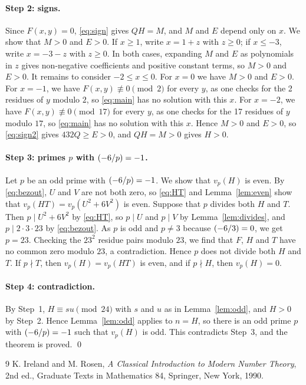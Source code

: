 \documentclass[11pt]{article}
\newcommand{\leg}[2]{\mathchoice{\biggl(\dfrac{#1}{#2}\biggr)}{(#1/#2)}{(#1/#2)}{(#1/#2)}}
\begin{document}
\paragraph{Step 2: signs.} Since $F(x,y)=0$, \eqref{eq:sign} gives $QH=M$, and $M$ and $E$ depend only on $x$. We show that $M>0$ and $E>0$. If $x\geq1$, write $x=1+z$ with $z\geq0$; if $x\leq-3$, write $x=-3-z$ with $z\geq0$. In both cases, expanding $M$ and $E$ as polynomials in $z$ gives non-negative coefficients and positive constant terms, so $M>0$ and $E>0$. It remains to consider $-2\leq x\leq0$. For $x=0$ we have $M>0$ and $E>0$. For $x=-1$, we have $F(x,y)\not\equiv0\pmod{2}$ for every $y$, as one checks for the 2 residues of $y$ modulo $2$, so \eqref{eq:main} has no solution with this $x$. For $x=-2$, we have $F(x,y)\not\equiv0\pmod{17}$ for every $y$, as one checks for the 17 residues of $y$ modulo $17$, so \eqref{eq:main} has no solution with this $x$. Hence $M>0$ and $E>0$, so \eqref{eq:sign2} gives $432Q\geq E>0$, and $QH=M>0$ gives $H>0$.

\paragraph{\texorpdfstring{Step 3: primes $p$ with $\leg{-6}{p}=-1$.}{Step 3: inert primes.}} Let $p$ be an odd prime with $\leg{-6}{p}=-1$. We show that $v_p(H)$ is even. By \eqref{eq:bezout}, $U$ and $V$ are not both zero, so \eqref{eq:HT} and Lemma~\ref{lem:even} show that $v_p(HT)=v_p(U^2+6V^2)$ is even. Suppose that $p$ divides both $H$ and $T$. Then $p\mid U^2+6V^2$ by \eqref{eq:HT}, so $p\mid U$ and $p\mid V$ by Lemma~\ref{lem:divides}, and $p\mid 2\cdot 3\cdot 23$ by \eqref{eq:bezout}. As $p$ is odd and $p\neq3$ because $\leg{-6}{3}=0$, we get $p=23$. Checking the $23^2$ residue pairs modulo $23$, we find that $F$, $H$ and $T$ have no common zero modulo $23$, a contradiction. Hence $p$ does not divide both $H$ and $T$. If $p\nmid T$, then $v_p(H)=v_p(HT)$ is even, and if $p\nmid H$, then $v_p(H)=0$.

\paragraph{Step 4: contradiction.} By Step~1, $H\equiv su\pmod{24}$ with $s$ and $u$ as in Lemma~\ref{lem:odd}, and $H>0$ by Step~2. Hence Lemma~\ref{lem:odd} applies to $n=H$, so there is an odd prime $p$ with $\leg{-6}{p}=-1$ such that $v_p(H)$ is odd. This contradicts Step~3, and the theorem is proved.
\qed

\begin{thebibliography}{9}
 K. Ireland and M. Rosen, \emph{A Classical Introduction to Modern Number Theory}, 2nd ed., Graduate Texts in Mathematics 84, Springer, New York, 1990.
\end{thebibliography}
\end{document}
